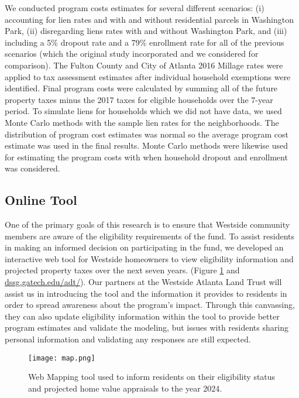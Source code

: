 \documentclass{acm_proc_article-sp}
\begin{document}
We conducted program costs estimates for several different scenarios: (i) accounting for lien rates and with and without residential parcels in Washington Park, (ii) disregarding liens rates with and without Washington Park, and (iii) including a 5\% dropout rate and a 79\% enrollment rate for all of the previous scenarios (which the original study incorporated and we considered for comparison). The Fulton County and City of Atlanta 2016 Millage rates were applied to tax assessment estimates after individual household exemptions were identified. Final program costs were calculated by summing all of the future property taxes minus the 2017 taxes for eligible households over the 7-year period. To simulate liens for households which we did not have data, we used Monte Carlo methods with the sample lien rates for the neighborhoods. The distribution of program cost estimates was normal so the average program cost estimate was used in the final results. Monte Carlo methods were likewise used for estimating the program costs with when household dropout and enrollment was considered.

\subsection{Online Tool}

One of the primary goals of this research is to ensure that Westside community members are aware of the eligibility requirements of the fund. To assist residents in making an informed decision on participating in the fund, we developed an interactive web tool for Westside homeowners to view eligibility information and projected property taxes over the next seven years. (Figure \ref{map} and \href{http://dssg.gatech.edu/adt/}{dssg.gatech.edu/adt/}). Our partners at the Westside Atlanta Land Trust will assist us in introducing the tool and the information it provides to residents in order to spread awareness about the program's impact. Through this canvassing, they can also update eligibility information within the tool to provide better program estimates and validate the modeling, but issues with residents sharing personal information and validating any responses are still expected.

\begin{figure}[h]
\centering
  \texttt{[image: map.png]} %
\caption{Web Mapping tool used to inform residents on their eligibility status and projected home value appraisals to the year 2024.}
\label{map}
\end{figure}
\end{document}
